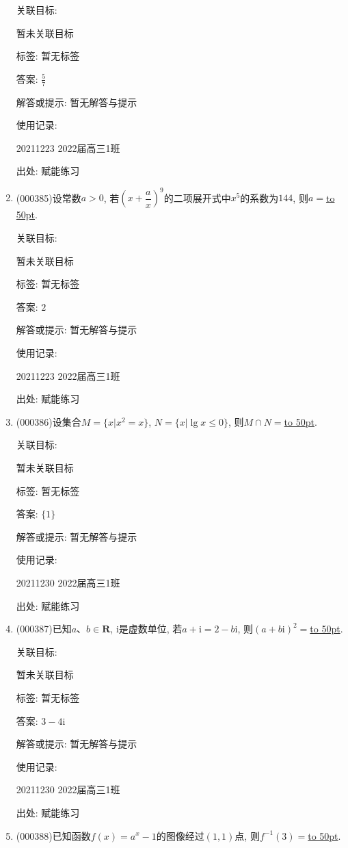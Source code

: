 \documentclass[10pt,a4paper]{article}
\newcommand{\blank}[1]{\underline{\hbox to #1pt{}}}
\begin{document}
\begin{enumerate}[1.]
关联目标:

暂未关联目标



标签: 暂无标签

答案: $\frac 57$

解答或提示: 暂无解答与提示

使用记录:

20211223	2022届高三1班	


出处: 赋能练习
\item { (000385)}设常数$a>0$, 若$(x+\dfrac ax)^9$的二项展开式中$x^5$的系数为$144$, 则$a=$\blank{50}.


关联目标:

暂未关联目标



标签: 暂无标签

答案: $2$

解答或提示: 暂无解答与提示

使用记录:

20211223	2022届高三1班	


出处: 赋能练习
\item { (000386)}设集合$M=\{x|x^2=x\}$, $N=\{x|\lg x\le 0\}$, 则$M\cap N=$\blank{50}.


关联目标:

暂未关联目标



标签: 暂无标签

答案: $\{1\}$

解答或提示: 暂无解答与提示

使用记录:

20211230	2022届高三1班	


出处: 赋能练习
\item { (000387)}已知$a$、$b\in \mathbf{R}$, $\mathrm{i}$是虚数单位, 若$a+\mathrm{i}=2-b\mathrm{i}$, 则$(a+b\mathrm{i})^2=$\blank{50}.


关联目标:

暂未关联目标



标签: 暂无标签

答案: $3-4\mathrm{i}$

解答或提示: 暂无解答与提示

使用记录:

20211230	2022届高三1班	


出处: 赋能练习
\item { (000388)}已知函数$f(x)=a^x-1$的图像经过$(1,1)$点, 则$f^{-1}(3)=$\blank{50}.



\end{enumerate}
\end{document}
